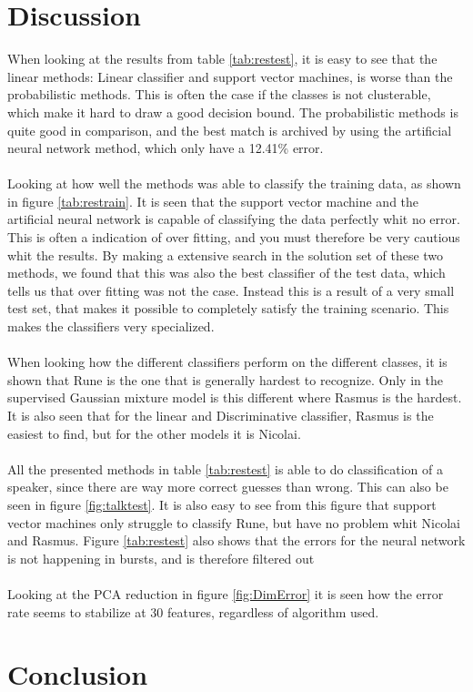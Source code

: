 \section{Discussion}
When looking at the results from table \ref{tab:restest}, it is easy to see that the linear methods: Linear classifier and support vector machines, is worse than the probabilistic methods. This is often the case if the classes is not clusterable, which make it hard to draw a good decision bound. The probabilistic methods is quite good in comparison, and the best match is archived by using the artificial neural network method, which only have a 12.41\% error. \\\ \\

Looking at how well the methods was able to classify the training data, as shown in figure \ref{tab:restrain}. It is seen that the support vector machine and the artificial neural network is capable of classifying the data perfectly whit no error. This is often a indication of over fitting, and you must therefore be very cautious whit the results. By making a extensive search in the solution set of these two methods, we found that this was also the best classifier of the test data, which tells us that over fitting was not the case. Instead this is a result of a very small test set, that makes it possible to completely satisfy the training scenario. This makes the classifiers very specialized. \\\ \\


When looking how the different classifiers perform on the different classes, it is shown that Rune is the one that is generally hardest to recognize. Only in the supervised Gaussian mixture model is this different where Rasmus is the hardest.  It is also seen that for the linear and Discriminative classifier, Rasmus is the easiest to find, but for the other models it is Nicolai. \\\ \\

All the presented methods in table \ref{tab:restest} is able to do classification of a speaker, since there are way more correct guesses than wrong. This can also be seen in figure \ref{fig:talktest}. It is also easy to see from this figure that support vector machines only struggle to classify Rune, but have no problem whit Nicolai and Rasmus. Figure \ref{tab:restest} also shows that the errors for the neural network is not happening in bursts, and is therefore filtered out \\\ \\

Looking at the PCA reduction in figure \ref{fig:DimError} it is seen how the error rate seems to stabilize at 30 features, regardless of algorithm used.


\section{Conclusion}
